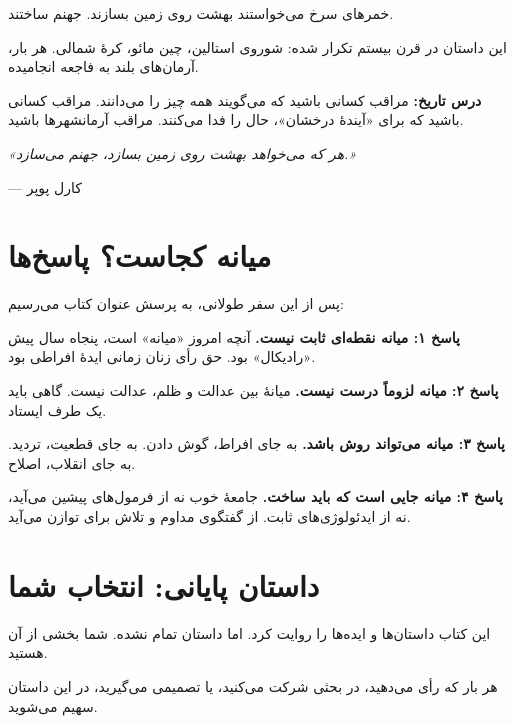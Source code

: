 خمرهای سرخ می‌خواستند بهشت روی زمین بسازند. جهنم ساختند.

این داستان در قرن بیستم تکرار شده: شوروی استالین، چین مائو، کرهٔ شمالی. هر بار، آرمان‌های بلند به فاجعه انجامیده.

\textbf{درس تاریخ:} مراقب کسانی باشید که می‌گویند همه چیز را می‌دانند. مراقب کسانی باشید که برای «آیندهٔ درخشان»، حال را فدا می‌کنند. مراقب آرمانشهرها باشید.

\begin{tcolorbox}[
    enhanced,
    colback=leftred!10,
    colframe=leftred,
    boxrule=1.5pt,
    arc=5pt
]
\begin{center}
\textit{«هر که می‌خواهد بهشت روی زمین بسازد، جهنم می‌سازد.»}

— کارل پوپر
\end{center}
\end{tcolorbox}

\section*{میانه کجاست؟ پاسخ‌ها}

پس از این سفر طولانی، به پرسش عنوان کتاب می‌رسیم:

\begin{tcolorbox}[
    enhanced,
    colback=centergreen!10,
    colframe=centergreen,
    boxrule=2pt,
    arc=8pt,
    fonttitle=\bfseries\large,
    title={\rl{پاسخ: میانه کجاست؟}}
]

\textbf{پاسخ ۱: میانه نقطه‌ای ثابت نیست.}
آنچه امروز «میانه» است، پنجاه سال پیش «رادیکال» بود. حق رأی زنان زمانی ایدهٔ افراطی بود.

\textbf{پاسخ ۲: میانه لزوماً درست نیست.}
میانهٔ بین عدالت و ظلم، عدالت نیست. گاهی باید یک طرف ایستاد.

\textbf{پاسخ ۳: میانه می‌تواند روش باشد.}
به جای افراط، گوش دادن. به جای قطعیت، تردید. به جای انقلاب، اصلاح.

\textbf{پاسخ ۴: میانه جایی است که باید ساخت.}
جامعهٔ خوب نه از فرمول‌های پیشین می‌آید، نه از ایدئولوژی‌های ثابت. از گفتگوی مداوم و تلاش برای توازن می‌آید.
\end{tcolorbox}

\section*{داستان پایانی: انتخاب شما}

این کتاب داستان‌ها و ایده‌ها را روایت کرد. اما داستان تمام نشده. شما بخشی از آن هستید.

هر بار که رأی می‌دهید، در بحثی شرکت می‌کنید، یا تصمیمی می‌گیرید، در این داستان سهیم می‌شوید.

